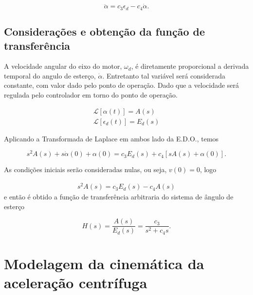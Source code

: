         \begin{equation}
            \ddot \alpha = c_3 \epsilon_d - c_4 \dot \alpha.
        \end{equation}
        
        \subsection{Considerações e obtenção da função de transferência}
		
		    A velocidade angular do eixo do motor, $\omega_d$, é diretamente proporcional a derivada temporal do angulo de esterço, $\dot \alpha$. Entretanto tal variável será considerada constante, com valor dado pelo ponto de operação. Dado que a velocidade será regulada pelo controlador em torno do ponto de operação.
		    
		    \begin{eqnarray}
                \mathcal{L} [\alpha(t)] = A(s)   \nonumber \\
                \mathcal{L} [\epsilon_d (t)] = E_d (s)
            \end{eqnarray}
            
            Aplicando a Transformada de Laplace em ambos lado da E.D.O., temos
            
            \begin{equation}
                s^2 A(s) + s\dot\alpha(0) + \alpha(0) = c_3 E_d(s) + c_4 [sA(s) + \alpha(0)].
            \end{equation}
            
            As condições iniciais serão consideradas nulas, ou seja, $v(0) = 0$, logo
            
            \begin{eqnarray}
                s^2 A(s) = c_3 E_d(s) - c_4 A(s)
            \end{eqnarray}
            e então é obtido a função de transferência arbitraria do sistema de ângulo de esterço
            
            \begin{equation}
                H(s)
                = \frac{A(s)}{E_d(s)}
                = \frac{c_3}{s^2 + c_4 s}.
            \end{equation}
		
		
	\section{Modelagem da cinemática da aceleração centrífuga}

